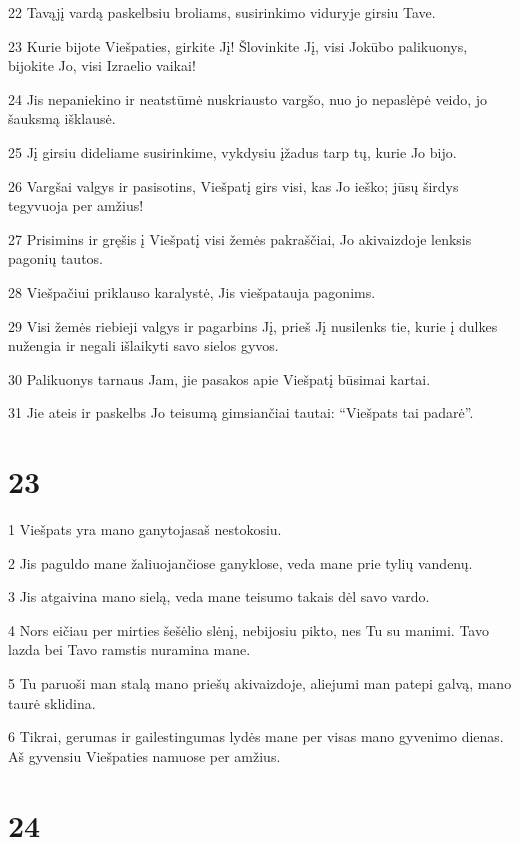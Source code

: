 \par 22 Tavąjį vardą paskelbsiu broliams, susirinkimo viduryje girsiu Tave. 
\par 23 Kurie bijote Viešpaties, girkite Jį! Šlovinkite Jį, visi Jokūbo palikuonys, bijokite Jo, visi Izraelio vaikai! 
\par 24 Jis nepaniekino ir neatstūmė nuskriausto vargšo, nuo jo nepaslėpė veido, jo šauksmą išklausė. 
\par 25 Jį girsiu dideliame susirinkime, vykdysiu įžadus tarp tų, kurie Jo bijo. 
\par 26 Vargšai valgys ir pasisotins, Viešpatį girs visi, kas Jo ieško; jūsų širdys tegyvuoja per amžius! 
\par 27 Prisimins ir gręšis į Viešpatį visi žemės pakraščiai, Jo akivaizdoje lenksis pagonių tautos. 
\par 28 Viešpačiui priklauso karalystė, Jis viešpatauja pagonims. 
\par 29 Visi žemės riebieji valgys ir pagarbins Jį, prieš Jį nusilenks tie, kurie į dulkes nužengia ir negali išlaikyti savo sielos gyvos. 
\par 30 Palikuonys tarnaus Jam, jie pasakos apie Viešpatį būsimai kartai. 
\par 31 Jie ateis ir paskelbs Jo teisumą gimsiančiai tautai: “Viešpats tai padarė”.



\chapter{23}


\par 1 Viešpats yra mano ganytojas­aš nestokosiu. 
\par 2 Jis paguldo mane žaliuojančiose ganyklose, veda mane prie tylių vandenų. 
\par 3 Jis atgaivina mano sielą, veda mane teisumo takais dėl savo vardo. 
\par 4 Nors eičiau per mirties šešėlio slėnį, nebijosiu pikto, nes Tu su manimi. Tavo lazda bei Tavo ramstis nuramina mane. 
\par 5 Tu paruoši man stalą mano priešų akivaizdoje, aliejumi man patepi galvą, mano taurė sklidina. 
\par 6 Tikrai, gerumas ir gailestingumas lydės mane per visas mano gyvenimo dienas. Aš gyvensiu Viešpaties namuose per amžius.



\chapter{24}


